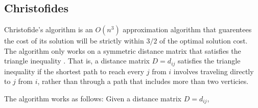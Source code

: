 \documentclass[11pt,fleqn]{article}
\begin{document}
\subsection{Christofides}
Christofide's algorithm is an $O(n^3)$ approximation algorithm that guarentees
the cost of its solution will be strictly within $3/2$ of the optimal solution
cost.  The algorithm only works on a symmetric distance matrix that satisfies
the triangle inequality \cite{nicos}.  That is, a distance matrix $D=d_{ij}$
satisfies the triangle inequality if the shortest path to reach every $j$ from
$i$ involves traveling directly to $j$ from $i$, rather than through a path that
includes more than two verticies.
\par

The algorithm works as follows: Given a distance matrix $D=d_{ij}$, 


%
%
%
\newpage


\end{document}
